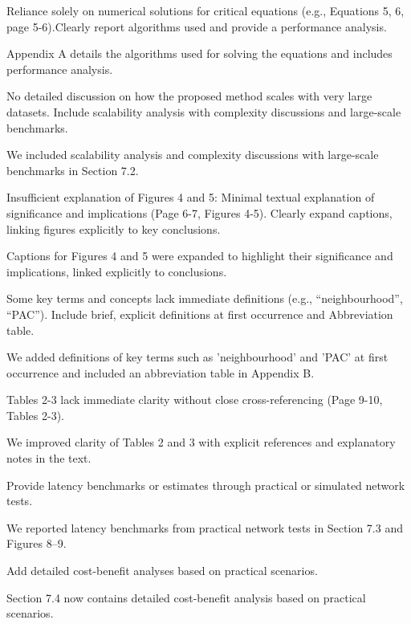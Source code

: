 \documentclass[11pt]{article}
\newcommand{\us}{\rm \setlength{\leftskip}{0.3cm} \setlength{\rightskip}{0.3cm}}
\newcommand{\them}{\it \setlength{\leftskip}{0cm} \setlength{\rightskip}{0cm}}
\begin{document}
\them

Reliance solely on numerical solutions for critical equations (e.g., Equations 5, 6, page 5-6).Clearly report algorithms used and provide a performance analysis.

\us
Appendix A details the algorithms used for solving the equations and includes performance analysis.

\them

No detailed discussion on how the proposed method scales with very large datasets. Include scalability analysis with complexity discussions and large-scale benchmarks.

\us
We included scalability analysis and complexity discussions with large-scale benchmarks in Section 7.2.

\them

Insufficient explanation of Figures 4 and 5: Minimal textual explanation of significance and implications (Page 6-7, Figures 4-5). Clearly expand captions, linking figures explicitly to key conclusions.

\us
Captions for Figures 4 and 5 were expanded to highlight their significance and implications, linked explicitly to conclusions.

\them

Some key terms and concepts lack immediate definitions (e.g., ``neighbourhood'', ``PAC''). Include brief, explicit definitions at first occurrence and Abbreviation table.

\us
We added definitions of key terms such as 'neighbourhood' and 'PAC' at first occurrence and included an abbreviation table in Appendix B.

\them

Tables 2-3 lack immediate clarity without close cross-referencing (Page 9-10, Tables 2-3).

\us
We improved clarity of Tables 2 and 3 with explicit references and explanatory notes in the text.

\them

Provide latency benchmarks or estimates through practical or simulated network tests.

\us
We reported latency benchmarks from practical network tests in Section 7.3 and Figures 8–9.

\them

Add detailed cost-benefit analyses based on practical scenarios.

\us
Section 7.4 now contains detailed cost-benefit analysis based on practical scenarios.
\end{document}
